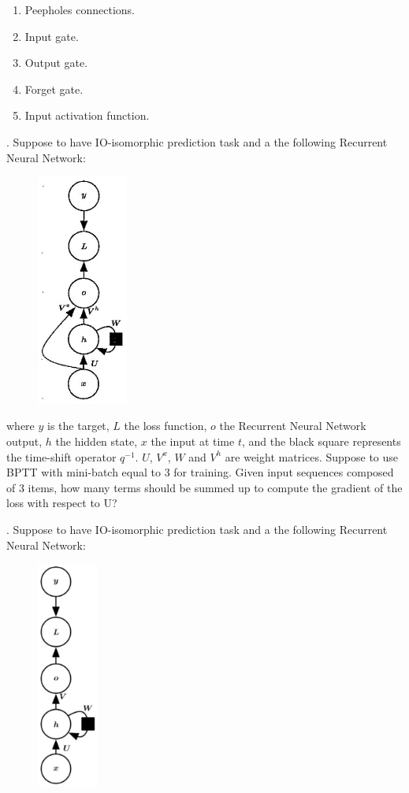 \begin{enumerate}[label=\roman*]
    \item Peepholes connections.
    \item Input gate.
    \item Output gate.
    \item Forget gate.
    \item Input activation function.
\end{enumerate}

. Suppose to have IO-isomorphic prediction task and a the following Recurrent Neural Network:

\begin{figure}[h]
    \centering
    \includegraphics[width=3cm]{Images/io-isomorphic-rnn.jpg}
    \label{fig:io-rnn}
\end{figure}

where $y$ is the target, $L$ the loss function, $o$ the Recurrent Neural Network output, $h$ the hidden state, $x$ the input at time $t$, and the black square represents the time-shift operator $q^{-1}$. $U$, $V^{x}$, $W$ and $V^{h}$ are weight matrices. Suppose to use BPTT with mini-batch equal to 3 for training. Given input sequences composed of 3 items, how many terms should be summed up to compute the gradient of the loss with respect to U?

\newpage
{}. Suppose to have IO-isomorphic prediction task and a the following Recurrent Neural Network:

\begin{figure}[h]
    \centering
    \includegraphics[width=2cm]{Images/io-isomorphic-rnn2.jpg}
    \label{fig:io-rnn2}
\end{figure}


